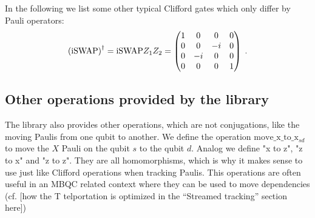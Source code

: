 \documentclass[a4paper,english]{scrartcl}
\begin{document}
\begin{remark}
In the following we list some other typical Clifford gates which only differ by Pauli
operators:
\begin{align}
  \w(\iSwap)\ur = \iSwap Z_1Z_2 = \matp{1&0&0&0\\0&0&-i&0\\0&-i&0&0\\0&0&0&1}\;.
\end{align}
\end{remark}

\subsection{Other operations provided by the library}

The library also provides other operations, which are not conjugations, like the moving
Paulis from one qubit to another. We define the operation $\mathrm{move\_x\_to\_x}_{sd}$
to move the $X$ Pauli on the qubit $s$ to the qubit $d$. Analog we define "x to z", "z
to x" and "z to z". They are all homomorphisms, which is why it makes sense to use just
like Clifford operations when tracking Paulis. This operations are often useful in an
MBQC related context where they can be used to move dependencies (cf.
[how the T
telportation is optimized in the ``Streamed tracking'' section here])
\end{document}
